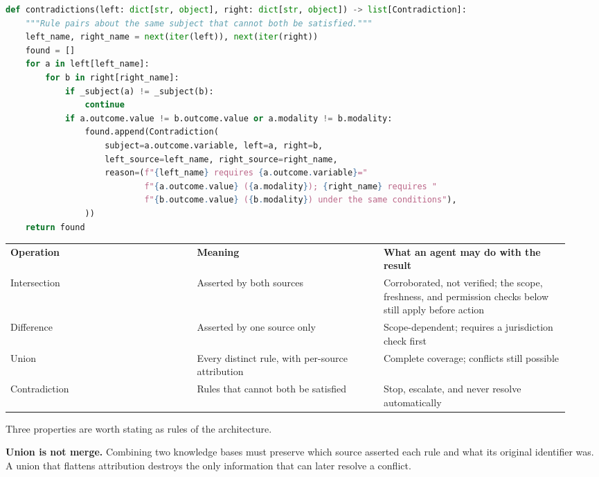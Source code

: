 \begin{lstlisting}[style=bookcode,title={\BookSnake},language=Python]
def contradictions(left: dict[str, object], right: dict[str, object]) -> list[Contradiction]:
    """Rule pairs about the same subject that cannot both be satisfied."""
    left_name, right_name = next(iter(left)), next(iter(right))
    found = []
    for a in left[left_name]:
        for b in right[right_name]:
            if _subject(a) != _subject(b):
                continue
            if a.outcome.value != b.outcome.value or a.modality != b.modality:
                found.append(Contradiction(
                    subject=a.outcome.variable, left=a, right=b,
                    left_source=left_name, right_source=right_name,
                    reason=(f"{left_name} requires {a.outcome.variable}="
                            f"{a.outcome.value} ({a.modality}); {right_name} requires "
                            f"{b.outcome.value} ({b.modality}) under the same conditions"),
                ))
    return found
\end{lstlisting}

\BookTableStart
\small
\begin{tabular}{@{}Y{0.3133\linewidth}Y{0.3133\linewidth}Y{0.3133\linewidth}@{}}
\color{white}\bfseries Operation & \color{white}\bfseries Meaning & \color{white}\bfseries What an agent may do with the result \\
Intersection & Asserted by both sources & Corroborated, not verified; the scope, freshness, and permission checks below still apply before action \\
Difference & Asserted by one source only & Scope-dependent; requires a jurisdiction check first \\
Union & Every distinct rule, with per-source attribution & Complete coverage; conflicts still possible \\
Contradiction & Rules that cannot both be satisfied & Stop, escalate, and never resolve automatically \\
\end{tabular}
\BookTableEnd

Three properties are worth stating as rules of the architecture.\par

\textbf{Union is not merge.} Combining two knowledge bases must preserve which source asserted each rule and what its original identifier was. A union that flattens attribution destroys the only information that can later resolve a conflict.\par


